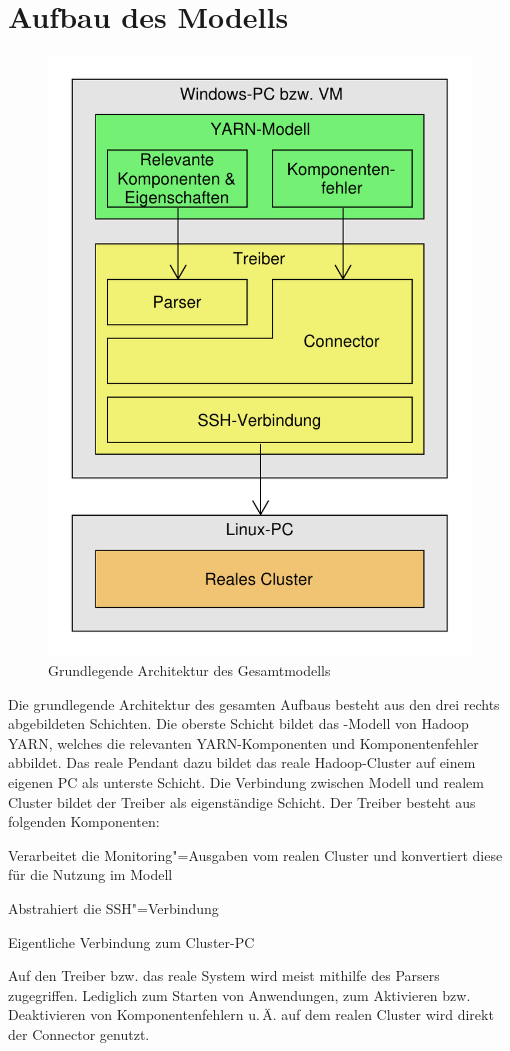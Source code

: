 \chapter{Aufbau des Modells}\label{chap:modell}

\begin{figure}
    \centering
    \includegraphics[width=0.5\columnwidth]{./images/modelArchitecture.pdf}
    \caption{Grundlegende Architektur des Gesamtmodells}
    \label{fig:modelArchitecture}
\end{figure}

Die grundlegende Architektur des gesamten Aufbaus besteht aus den drei rechts abgebildeten Schichten. Die oberste Schicht bildet das \sS-Modell von Hadoop YARN, welches die relevanten YARN-Komponenten und Komponentenfehler abbildet. Das reale Pendant dazu bildet das reale Hadoop-Cluster auf einem eigenen PC als unterste Schicht. Die Verbindung zwischen Modell und realem Cluster bildet der Treiber als eigenständige Schicht. Der Treiber besteht aus folgenden Komponenten:

\begin{description}[noitemsep]
    \item [Parser] Verarbeitet die Monitoring"=Ausgaben vom realen Cluster und konvertiert diese für die Nutzung im Modell
    \item [Connector] Abstrahiert die SSH"=Verbindung
    \item [SSH-Verbindung] Eigentliche Verbindung zum Cluster-PC
\end{description}

Auf den Treiber bzw. das reale System wird meist mithilfe des Parsers zugegriffen. Lediglich zum Starten von Anwendungen, zum Aktivieren bzw. Deaktivieren von Komponentenfehlern u.\,Ä. auf dem realen Cluster wird direkt der Connector genutzt.



